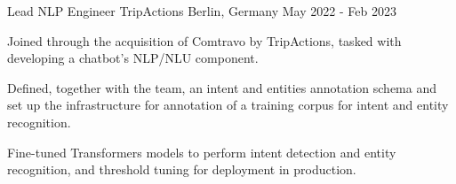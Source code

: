 

\begin{cventries}
  \cventry
    {Lead NLP Engineer} %
    {TripActions} %
    {Berlin, Germany} %
    {May 2022 - Feb 2023} %
	{
      \begin{cvitems} %
		\item {Joined through the acquisition of Comtravo by TripActions, tasked with developing a chatbot's NLP/NLU component.}
		\item {Defined, together with the team, an intent and entities annotation schema and set up the infrastructure for annotation of a training corpus for intent and entity recognition.}
		\item {Fine-tuned Transformers models to perform intent detection and entity recognition, and threshold tuning for deployment in production.}
      \end{cvitems}
    }



\end{cventries}
